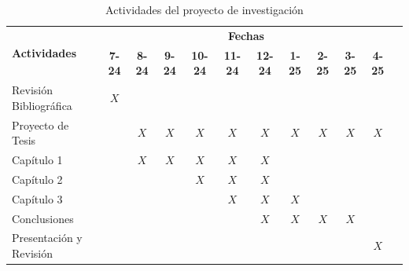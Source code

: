 \begin{center}
\begin{table}[htb]
\begin{tabular}{|p{4cm}|c|c|c|c|c|c|c|c|c|c|c|}
\hline
\multirow{2}{*}{\textbf{Actividades }} &\multicolumn{10}{c|}{\textbf{Fechas}} \\

 \cline{2-11}
 & \textbf{7-24} & \textbf{8-24} & \textbf{9-24}&\textbf{10-24}&\textbf{11-24}&\textbf{12-24}&
 \textbf{1-25}&\textbf{2-25}&\textbf{3-25}&\textbf{4-25}\\ \hline
 Revisión Bibliográfica & $X$ &&&&&&&&&\\ \hline
 Proyecto de Tesis &&$X$ &$X$&$X$&$X$&$X$&$X$&$X$&$X$&$X$ \\ \hline
 Capítulo 1 &&$X$ & $X$&$X$&$X$&$X$&&&&\\ \hline
Capítulo 2&&& &$X$&$X$& $X$& &&&\\ \hline
Capítulo 3 &&& &&$X$&$X$&$X$& & &\\ \hline
Conclusiones&&& &&&$X$&$X$&$X$&$X$& \\ \hline
Presentación y Revisión&&& &&&&&&&$X$\\ \hline
\end{tabular}
\caption{Actividades del proyecto de investigación}
\label{tabla:final}
\end{table}
\end{center}





